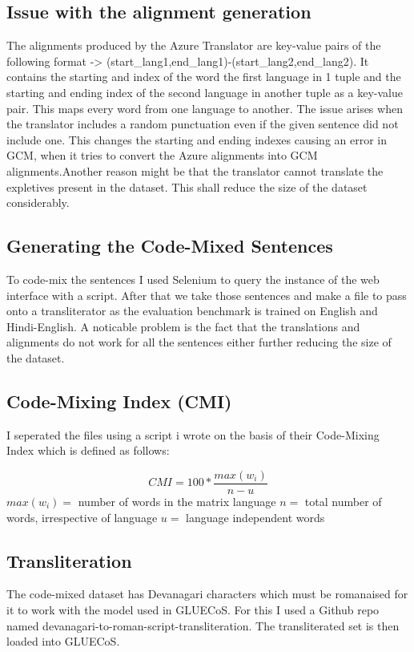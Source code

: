 \documentclass{article}
\begin{document}
\subsection{Issue with the alignment generation}
The alignments produced by the Azure Translator are key-value pairs of the following format -> (start\_lang1,end\_lang1)-(start\_lang2,end\_lang2).
It contains the starting and index of the word the first language in 1 tuple and the starting and ending index of the second language in another tuple as a key-value pair. This maps every word from one language to another.\newline\newline
The issue arises when the translator includes a random punctuation even if the given sentence did not include one. This changes the starting and ending indexes causing an error in GCM, when it tries to convert the Azure alignments into GCM alignments.Another reason might be that the translator cannot translate the expletives present in the dataset.
This shall reduce the size of the dataset considerably.

\subsection{Generating the Code-Mixed Sentences}
To code-mix the sentences I used Selenium to query the instance of the web interface with a script.
After that we take those sentences and make a file to pass onto a transliterator as the evaluation benchmark is trained on English and Hindi-English.
\newline
\newline
A noticable problem is the fact that the translations and alignments do not work for all the sentences either further reducing the size of the dataset.

\subsection{Code-Mixing Index (CMI)}
I seperated the files using a script i wrote on the basis of their Code-Mixing Index which is defined as follows:

\[CMI = 100*\frac{max(w_i)}{n-u}\]
\noindent
$max(w_i) = $ number of words in the matrix language\newline
$n = $ total number of words, irrespective of language\newline
$u = $ language independent words\newline

\subsection{Transliteration}
The code-mixed dataset has Devanagari characters which must be romanaised for it to work with the model used in GLUECoS.
For this I used a Github repo named devanagari-to-roman-script-transliteration.
The transliterated set is then loaded into GLUECoS.
\end{document}

